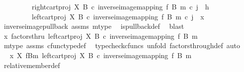\begin{isabellebody}
\ \ \ \ \ \ \ \ \ {\isacharparenleft}{\kern0pt}right{\isacharunderscore}{\kern0pt}cart{\isacharunderscore}{\kern0pt}proj\ X\ B\ {\isasymcirc}\isactrlsub c\ inverse{\isacharunderscore}{\kern0pt}image{\isacharunderscore}{\kern0pt}mapping\ f\ B\ m{\isacharparenright}{\kern0pt}\ {\isasymcirc}\isactrlsub c\ j\ {\isacharequal}{\kern0pt}\ h\ {\isasymand}\isanewline
\ \ \ \ \ \ \ \ \ {\isacharparenleft}{\kern0pt}left{\isacharunderscore}{\kern0pt}cart{\isacharunderscore}{\kern0pt}proj\ X\ B\ {\isasymcirc}\isactrlsub c\ inverse{\isacharunderscore}{\kern0pt}image{\isacharunderscore}{\kern0pt}mapping\ f\ B\ m{\isacharparenright}{\kern0pt}\ {\isasymcirc}\isactrlsub c\ j\ {\isacharequal}{\kern0pt}\ x{\isachardoublequoteclose}\isanewline
\ \ \ \ \isamarkupfalse%
\ inverse{\isacharunderscore}{\kern0pt}image{\isacharunderscore}{\kern0pt}pullback\ assms\ m{\isacharunderscore}{\kern0pt}type\ \isamarkupfalse%
\ is{\isacharunderscore}{\kern0pt}pullback{\isacharunderscore}{\kern0pt}def\ \isamarkupfalse%
\ blast\isanewline
\ \ \isamarkupfalse%
\ \isamarkupfalse%
\ {\isachardoublequoteopen}x\ factorsthru\ {\isacharparenleft}{\kern0pt}left{\isacharunderscore}{\kern0pt}cart{\isacharunderscore}{\kern0pt}proj\ X\ B\ {\isasymcirc}\isactrlsub c\ inverse{\isacharunderscore}{\kern0pt}image{\isacharunderscore}{\kern0pt}mapping\ f\ B\ m{\isacharparenright}{\kern0pt}{\isachardoublequoteclose}\isanewline
\ \ \ \ \isamarkupfalse%
\ m{\isacharunderscore}{\kern0pt}type\ assms\ cfunc{\isacharunderscore}{\kern0pt}type{\isacharunderscore}{\kern0pt}def\ \isamarkupfalse%
\ {\isacharparenleft}{\kern0pt}typecheck{\isacharunderscore}{\kern0pt}cfuncs{\isacharcomma}{\kern0pt}\ unfold\ factors{\isacharunderscore}{\kern0pt}through{\isacharunderscore}{\kern0pt}def{\isacharcomma}{\kern0pt}\ auto{\isacharparenright}{\kern0pt}\isanewline
\ \ \isamarkupfalse%
\ \isamarkupfalse%
\ {\isachardoublequoteopen}x\ {\isasymin}\isactrlbsub X\isactrlesub \ {\isacharparenleft}{\kern0pt}f\isactrlsup {\isacharminus}{\kern0pt}B{\isasymrparr}\isactrlbsub m\isactrlesub {\isacharcomma}{\kern0pt}\ left{\isacharunderscore}{\kern0pt}cart{\isacharunderscore}{\kern0pt}proj\ X\ B\ {\isasymcirc}\isactrlsub c\ inverse{\isacharunderscore}{\kern0pt}image{\isacharunderscore}{\kern0pt}mapping\ f\ B\ m{\isacharparenright}{\kern0pt}{\isachardoublequoteclose}\isanewline
\ \ \ \ \isamarkupfalse%
\ relative{\isacharunderscore}{\kern0pt}member{\isacharunderscore}{\kern0pt}def{}\ \isamarkupfalse%

\end{isabellebody}

